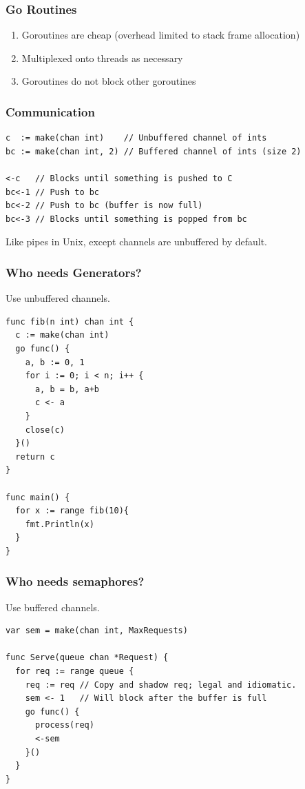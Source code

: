 \documentclass[xelatex,aspectratio=169]{beamer}
\begin{document}
\begin{frame}
	\frametitle{Go Routines}
	\begin{enumerate}
		\item<1> Goroutines are cheap (overhead limited to stack frame allocation)
		\item<2> Multiplexed onto threads as necessary
		\item<3> Goroutines do not block other goroutines
	\end{enumerate}
\end{frame}

\begin{frame}[fragile]
	\frametitle{Communication}
\begin{verbatim}
c  := make(chan int)    // Unbuffered channel of ints
bc := make(chan int, 2) // Buffered channel of ints (size 2)

<-c   // Blocks until something is pushed to C
bc<-1 // Push to bc
bc<-2 // Push to bc (buffer is now full)
bc<-3 // Blocks until something is popped from bc
\end{verbatim}
\begin{flushleft}
	Like pipes in Unix, except channels are unbuffered by default.
\end{flushleft}
\end{frame}

\begin{frame}[fragile]
	\frametitle{Who needs Generators?}
	Use unbuffered channels.
\tiny
\begin{verbatim}
func fib(n int) chan int {
  c := make(chan int)
  go func() {
    a, b := 0, 1
    for i := 0; i < n; i++ {
      a, b = b, a+b
      c <- a
    }
    close(c)
  }()
  return c
}

func main() {
  for x := range fib(10){
    fmt.Println(x)
  }
}
\end{verbatim}
\end{frame}

\begin{frame}[fragile]
	\frametitle{Who needs semaphores?}
	Use buffered channels.
\tiny
\begin{verbatim}
var sem = make(chan int, MaxRequests)

func Serve(queue chan *Request) {
  for req := range queue {
    req := req // Copy and shadow req; legal and idiomatic.
    sem <- 1   // Will block after the buffer is full
    go func() {
      process(req)
      <-sem
    }()
  }
}
\end{verbatim}
\end{frame}
\end{document}
